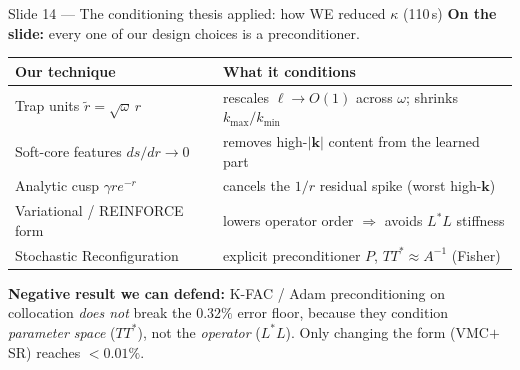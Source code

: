 \documentclass[11pt]{article}
\begin{document}
\begin{slide}{Slide 14 --- The conditioning thesis applied: how WE reduced $\kappa$ (110\,s)}
\textbf{On the slide:} every one of our design choices is a preconditioner.
\begin{center}
\begin{tabular}{ll}
\toprule
\textbf{Our technique} & \textbf{What it conditions} \\
\midrule
Trap units $\tilde r=\sqrt\omega\,r$ & rescales $\ell\to O(1)$ across $\omega$; shrinks $k_{\max}/k_{\min}$ \\
Soft-core features $ds/dr\to0$ & removes high-$|\mathbf k|$ content from the learned part \\
Analytic cusp $\gamma r e^{-r}$ & cancels the $1/r$ residual spike (worst high-$\mathbf k$) \\
Variational / REINFORCE form & lowers operator order $\Rightarrow$ avoids $L^\ast L$ stiffness \\
Stochastic Reconfiguration & explicit preconditioner $P$, $TT^\ast\!\approx\!A^{-1}$ (Fisher) \\
\bottomrule
\end{tabular}
\end{center}
\textbf{Negative result we can defend:} K-FAC / Adam preconditioning on collocation \emph{does not}
break the $0.32\%$ error floor, because they condition \emph{parameter space} ($TT^\ast$), not the
\emph{operator} ($L^\ast L$). Only changing the form (VMC$+$SR) reaches $<0.01\%$.
\end{slide}
\end{document}
